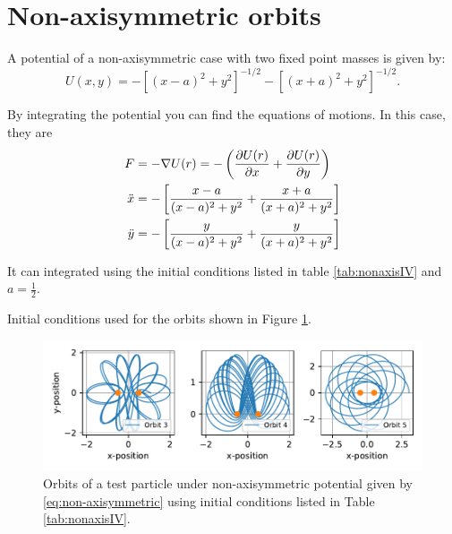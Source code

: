 \section{Non-axisymmetric orbits}

A potential of a non-axisymmetric case with two fixed point
masses is given by:
\begin{equation}
    U(x,y) = -[(x-a)^2 +y^2]^{-1/2} -[(x+a)^2 +y^2]^{-1/2}.
    \label{eq:non-axisymmetric}
\end{equation}


By integrating the potential you can find the equations of motions. In this case, they are
\begin{align*}
    F&=-\nabla U(r) =-\left(\frac{\partial U(r)}{\partial x}+\frac{\partial U(r)}{\partial y}\right)\\
    \Ddot{x}&=-\left[\frac{x-a}{(x-a)^2+y^2}+\frac{x+a}{(x+a)^2+y^2}\right] \\
    \Ddot{y}&=- \left[\frac{y}{(x-a)^2+y^2}+\frac{y}{(x+a)^2+y^2}\right]
\end{align*}

It can integrated using the initial conditions listed in table \ref{tab:nonaxisIV} and $a= \frac{1}{2}$.

\begin{table}[]
    \centering

    \caption{Initial conditions used for the orbits shown in Figure \ref{fig:nonaxisOrbits}.}
    \label{tab:nonaxisIV}
\end{table}

\begin{figure}[htb!]
    \centering
    \includegraphics{CodeAndFigures/NonAxisSymetricOrbits.pdf}
    \caption{Orbits of a test particle under non-axisymmetric potential given by \ref{eq:non-axisymmetric} using initial conditions listed in Table \ref{tab:nonaxisIV}.}
    \label{fig:nonaxisOrbits}
\end{figure}

